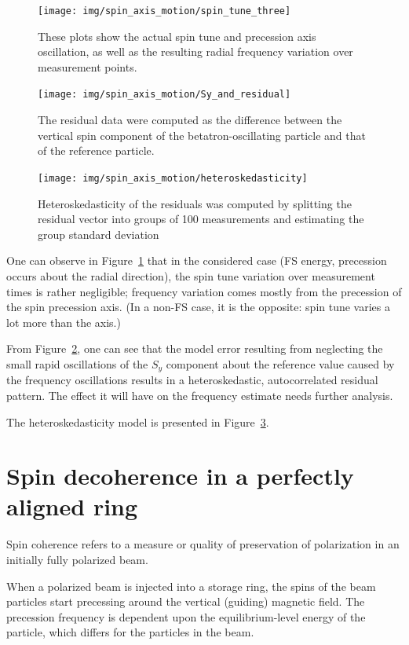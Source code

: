 \documentclass{article}
\begin{document}
\begin{figure}[!h]
  \centering
  \texttt{[image: img/spin\_axis\_motion/spin\_tune\_three]}
  \caption{These plots show the actual spin tune and precession axis oscillation, as well as the resulting radial frequency variation over measurement points.\label{fig:SpinTuneData}}
\end{figure}
\begin{figure}[!h]
  \centering
  \texttt{[image: img/spin\_axis\_motion/Sy\_and\_residual]}
  \caption{The residual data were computed as the difference between the vertical spin component of the betatron-oscillating particle and that of the reference particle.\label{fig:ResidualPlot}}
\end{figure}
\begin{figure}[!h]
  \centering
  \texttt{[image: img/spin\_axis\_motion/heteroskedasticity]}
  \caption{Heteroskedasticity of the residuals was computed by splitting the residual vector into groups of 100 measurements and estimating the group standard deviation\label{fig:Heteroskedasticity}}
\end{figure}

One can observe in Figure~\ref{fig:SpinTuneData} that in the considered case (FS energy, precession occurs about the radial direction), the spin tune variation over measurement times is rather negligible; frequency variation comes mostly from the precession of the spin precession axis. (In a non-FS case, it is the opposite: spin tune varies a lot more than the axis.)

From Figure~\ref{fig:ResidualPlot}, one can see that the model error resulting from neglecting the small rapid oscillations of the $S_y$ component about the reference value caused by the frequency oscillations results in a heteroskedastic, autocorrelated residual pattern. The effect it will have on the frequency estimate needs further analysis.

The heteroskedasticity model is presented in Figure~\ref{fig:Heteroskedasticity}.

\section{Spin decoherence in a perfectly aligned ring}
Spin coherence refers to a measure or quality of preservation of polarization in an initially fully polarized beam.~\citep[p.~205]{Eremey:Thesis}

When a polarized beam is injected into a storage ring, the spins of the beam particles start precessing around the vertical (guiding) magnetic field. The precession frequency is dependent upon the equilibrium-level energy of the particle, which differs for the particles in the beam.
\end{document}
